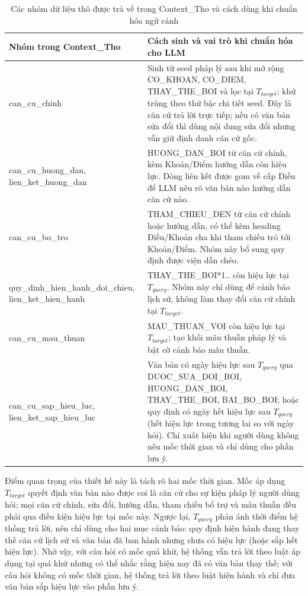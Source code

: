 \documentclass[../DoAn.tex]{subfiles}
\begin{document}
\begin{table}[htbp]
\centering
\footnotesize
\renewcommand{\arraystretch}{1.08}
\begin{tabularx}{\textwidth}{|>{\raggedright\arraybackslash}p{4.4cm}|>{\raggedright\arraybackslash}X|}
\hline
\textbf{Nhóm trong Context\_Tho} & \textbf{Cách sinh và vai trò khi chuẩn hóa cho LLM} \\ \hline
can\_cu\_chinh &
Sinh từ seed pháp lý sau khi mở rộng CO\_KHOAN, CO\_DIEM, THAY\_THE\_BOI và lọc tại $T_{target}$; khử trùng theo thứ bậc chi tiết seed. Đây là căn cứ trả lời trực tiếp; nếu có văn bản sửa đổi thì dùng nội dung sửa đổi nhưng vẫn giữ định danh căn cứ gốc. \\ \hline
can\_cu\_huong\_dan, lien\_ket\_huong\_dan &
HUONG\_DAN\_BOI từ căn cứ chính, kèm Khoản/Điểm hướng dẫn còn hiệu lực. Dòng liên kết được gom về cấp Điều để LLM nêu rõ văn bản nào hướng dẫn căn cứ nào. \\ \hline
can\_cu\_bo\_tro &
THAM\_CHIEU\_DEN từ căn cứ chính hoặc hướng dẫn, có thể kèm heading Điều/Khoản cha khi tham chiếu trỏ tới Khoản/Điểm. Nhóm này bổ sung quy định được viện dẫn chéo. \\ \hline
quy\_\allowbreak dinh\_\allowbreak hien\_\allowbreak hanh\_\allowbreak doi\_\allowbreak chieu, lien\_\allowbreak ket\_\allowbreak hien\_\allowbreak hanh &
THAY\_THE\_BOI*1.. còn hiệu lực tại $T_{query}$. Nhóm này chỉ dùng để cảnh báo lịch sử, không làm thay đổi căn cứ chính tại $T_{target}$. \\ \hline
can\_cu\_mau\_thuan &
MAU\_THUAN\_VOI còn hiệu lực tại $T_{target}$; tạo khối mâu thuẫn pháp lý và bật cờ cảnh báo mâu thuẫn. \\ \hline
can\_cu\_sap\_hieu\_luc, lien\_ket\_sap\_hieu\_luc &
Văn bản có ngày hiệu lực sau $T_{query}$ qua DUOC\_SUA\_DOI\_BOI, HUONG\_DAN\_BOI, THAY\_THE\_BOI, BAI\_BO\_BOI; hoặc quy định có ngày hết hiệu lực sau $T_{query}$ (hết hiệu lực trong tương lai so với ngày hỏi). Chỉ xuất hiện khi người dùng không nêu mốc thời gian và chỉ dùng cho phần lưu ý. \\ \hline
\end{tabularx}
\caption{Các nhóm dữ liệu thô được trả về trong Context\_Tho và cách dùng khi chuẩn hóa ngữ cảnh}
\label{tab:context_tho_temporal_fields}
\end{table}

Điểm quan trọng của thiết kế này là tách rõ hai mốc thời gian. Mốc áp dụng $T_{target}$ quyết định văn bản nào được coi là căn cứ cho sự kiện pháp lý người dùng hỏi; mọi căn cứ chính, sửa đổi, hướng dẫn, tham chiếu bổ trợ và mâu thuẫn đều phải qua điều kiện hiệu lực tại mốc này. Ngược lại, $T_{query}$ phản ánh thời điểm hệ thống trả lời, nên chỉ dùng cho hai mục cảnh báo: quy định hiện hành đang thay thế căn cứ lịch sử và văn bản đã ban hành nhưng chưa có hiệu lực (hoặc sắp hết hiệu lực). Nhờ vậy, với câu hỏi có mốc quá khứ, hệ thống vẫn trả lời theo luật áp dụng tại quá khứ nhưng có thể nhắc rằng hiện nay đã có văn bản thay thế; với câu hỏi không có mốc thời gian, hệ thống trả lời theo luật hiện hành và chỉ đưa văn bản sắp hiệu lực vào phần lưu ý.
\end{document}

